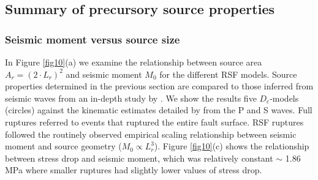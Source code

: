\documentclass[preprint,1p, 10pt,authoryear]{elsarticle}
\begin{document}
\subsection{Summary of precursory source properties}
\subsubsection{Seismic moment versus source size}
In Figure \ref{fig10}(a) we examine the relationship between source area $A_{r} = (2\cdot L_{r})^{2}$ and seismic moment $M_{0}$ for the different RSF models. Source properties determined in the previous section are compared to those inferred from seismic waves from an in-depth study by \citet{Selvadurai2019}. We show the results five $D_{c}$-models (circles) against the kinematic estimates detailed by \citet{Selvadurai2019} from the P and S waves.  Full ruptures referred to events that ruptured the entire fault surface. RSF ruptures followed the routinely observed empirical scaling relationship between seismic moment and source geometry ($M_{0} \propto L_{r}^{3}$). Figure \ref{fig10}(c) shows the relationship between stress drop and seismic moment, which was relatively constant $\sim$ 1.86 MPa where smaller ruptures had slightly lower values of stress drop.
\end{document}
